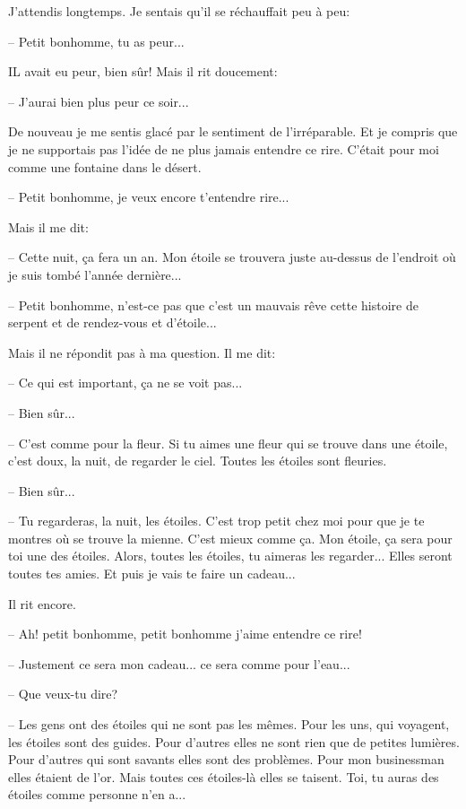 \documentclass[a4paper]{report}
\begin{document}
J'attendis longtemps. Je sentais qu'il se réchauffait peu à peu:

-- Petit bonhomme, tu as peur...

IL avait eu peur, bien sûr! Mais il rit doucement:

-- J'aurai bien plus peur ce soir...

De nouveau je me sentis glacé par le sentiment de l'irréparable. Et je compris que je ne supportais pas l'idée de ne plus jamais entendre ce rire. C'était pour moi comme une fontaine dans le désert.

-- Petit bonhomme, je veux encore t'entendre rire...

Mais il me dit:

-- Cette nuit, ça fera un an. Mon étoile se trouvera juste au-dessus de l'endroit où je suis tombé l'année dernière...

-- Petit bonhomme, n'est-ce pas que c'est un mauvais rêve cette histoire de serpent et de rendez-vous et d'étoile...

Mais il ne répondit pas à ma question. Il me dit:

-- Ce qui est important, ça ne se voit pas...

-- Bien sûr...

-- C'est comme pour la fleur. Si tu aimes une fleur qui se trouve dans une étoile, c'est doux, la nuit, de regarder le ciel. Toutes les étoiles sont fleuries.

-- Bien sûr...

-- Tu regarderas, la nuit, les étoiles. C'est trop petit chez moi pour que je te montres où se trouve la mienne. C'est mieux comme ça. Mon étoile, ça sera pour toi une des étoiles. Alors, toutes les étoiles, tu aimeras les regarder... Elles seront toutes tes amies. Et puis je vais te faire un cadeau...

Il rit encore.

-- Ah! petit bonhomme, petit bonhomme j'aime entendre ce rire!

-- Justement ce sera mon cadeau... ce sera comme pour l'eau...

-- Que veux-tu dire?

-- Les gens ont des étoiles qui ne sont pas les mêmes. Pour les uns, qui voyagent, les étoiles sont des guides. Pour d'autres elles ne sont rien que de petites lumières. Pour d'autres qui sont savants elles sont des problèmes. Pour mon businessman elles étaient de l'or. Mais toutes ces étoiles-là elles se taisent. Toi, tu auras des étoiles comme personne n'en a...
\end{document}
